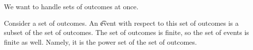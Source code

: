 

We want to handle sets of outcomes at once.


Consider a set of outcomes.
An \t{event} with respect to this set of outcomes is a subset of the set of outcomes.
The set of outcomes is finite, so the set of events is finite as well.
Namely, it is the power set of the set of outcomes.
